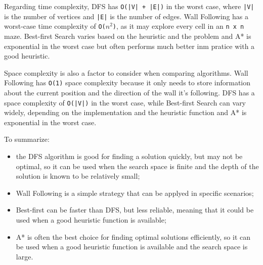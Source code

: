 \documentclass[10pt, letterpaper]{article}
\begin{document}
Regarding time complexity, DFS has \texttt{O(|V| + |E|)} in the worst case, 
where \texttt{|V|} is the number of vertices and \texttt{|E|} is the number of edges. 
Wall Following has a worst-case time complexity of \texttt{O($n^{2}$)}, as it may 
explore every cell in an \texttt{n x n} maze. Best-first Search varies based on 
the heuristic and the problem and A* is exponential in the worst case 
but often performs much better inm pratice with a good heuristic.

Space complexity is also a factor to consider when comparing algorithms. 
Wall Following has \texttt{O(1)} space complexity because it only needs to store 
information about the current position and the direction of the wall 
it's following. DFS has a space complexity of \texttt{O(|V|)} in the worst case, 
while Best-first Search can vary widely, depending on the implementation 
and the heuristic function and A* is exponential in the worst case.

To summarize:
\begin{itemize}
    \item the DFS algorithm is good for finding a solution quickly, 
    but may not be optimal, so it can be used when the search space 
    is finite and the depth of the solution is known to be relatively 
    small;
    \item Wall Following is a simple strategy that can be applyed in 
    specific scenarios;
    \item Best-first can be faster than DFS, but less reliable, 
    meaning that it could be used when a good heuristic function 
    is available;
    \item A* is often the best choice for finding optimal solutions
    efficiently, so it can be used when a good heuristic function is 
    available and the search space is large.
\end{itemize}
\end{document}
